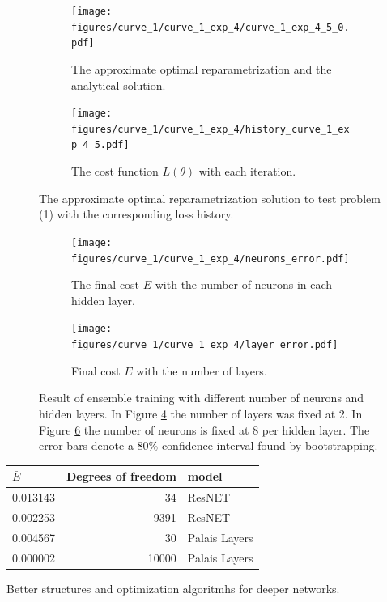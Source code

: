 \begin{figure}[t]\label{fig:curve_1_example}
    \begin{subfigure}[t]{0.5\textwidth}\label{fig:curve_1_solution}
        \centering
        \texttt{[image: figures/curve\_1/curve\_1\_exp\_4/curve\_1\_exp\_4\_5\_0.pdf]}
        \caption{The approximate optimal reparametrization and the analytical solution.}
    \end{subfigure}
    \begin{subfigure}[t]{0.5\textwidth}\label{fig:curve_1_history}
        \centering
        \texttt{[image: figures/curve\_1/curve\_1\_exp\_4/history\_curve\_1\_exp\_4\_5.pdf]}
        \caption{The cost function \(L(\theta)\) with each iteration.}
    \end{subfigure}
    \caption{The approximate optimal reparametrization solution to test problem (1) with the corresponding loss history.}
\end{figure}

\begin{figure}\label{fig:curve_1_parmas_eks}
    \begin{subfigure}[t]{0.5\textwidth}
        \centering
        \texttt{[image: figures/curve\_1/curve\_1\_exp\_4/neurons\_error.pdf]}
        \caption{The final cost \(E\) with the number of neurons in each hidden layer.}
        \label{fig:curve_1_neuron_error}
    \end{subfigure}
    \begin{subfigure}[t]{0.5\textwidth}
        \centering
        \texttt{[image: figures/curve\_1/curve\_1\_exp\_4/layer\_error.pdf]}
        \caption{Final cost \(E\) with the number of layers.}
        \label{fig:curve_1_layer_error}
    \end{subfigure}
    \caption{Result of ensemble training with different number of neurons and hidden layers. In Figure \ref{fig:curve_1_neuron_error} the number of layers was fixed at 2. In Figure \ref{fig:curve_1_layer_error} the number of neurons is fixed at 8 per hidden layer. The error bars denote a 80\% confidence interval found by bootstrapping.}
\end{figure}



\begin{tabular}{lrl}
    \toprule
    \(\bar{E} \) & Degrees of freedom & model         \\
    \midrule
    0.013143     & 34                 & ResNET        \\
    0.002253     & 9391               & ResNET        \\
    0.004567     & 30                 & Palais Layers \\
    0.000002     & 10000              & Palais Layers \\
    \bottomrule
\end{tabular}


Better structures and optimization algoritmhs for deeper networks.